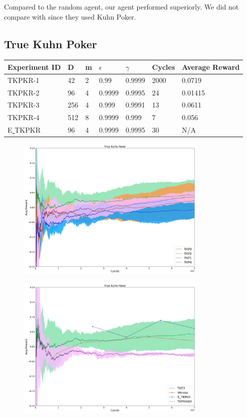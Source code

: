 \documentclass{article}
\theoremstyle{definition}
\newtheorem{primary statistics}[definition]{Primary Statistics}
\newtheorem{auxiliary statistics}[definition]{Auxiliary Statistics}
\begin{document}
Compared to the random agent, our agent performed superiorly. We did not compare with \cite{veness2011monte} since they used Kuhn Poker.

\newpage

\subsection{True Kuhn Poker}
\begin{tabular}{|l|l|l|l|l|l|l|}
\hline \centering
 Experiment ID& D & m & $\epsilon$ & $\gamma$ & Cycles & Average Reward \\ \hline
TKPKR-1  & 42        & 2           & 0.99        & 0.9999            & 2000   & 0.0719        \\ \hline
TKPKR-2  & 96        & 4           & 0.9999      & 0.9995            & 24     & 0.01415         \\ \hline
TKPKR-3  & 256       & 4           & 0.999       & 0.9991            & 13     & 0.0611         \\ \hline
TKPKR-4  & 512       & 8           & 0.9999      & 0.999             & 7      & 0.056      \\ \hline 
E\underline{ }TKPKR  & 96       & 4           & 0.9999      & 0.9995             & 30      & N/A      \\ \hline        
\end{tabular} 

 \begin{figure}[h]
 \centering
    \includegraphics[width=9.1cm]{4_True_Kuhn_Poker}
\end{figure}

 \begin{figure}[h]
 \centering
    \includegraphics[width=9.1cm]{True_Kuhn_Poker}
\end{figure}
\end{document}
